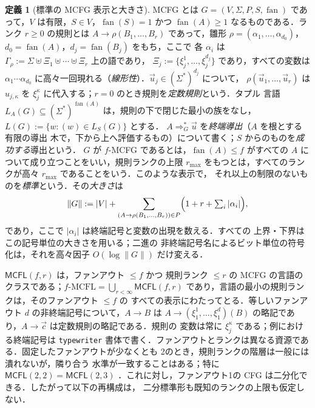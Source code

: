 \documentclass[11pt,a4paper]{ltjsarticle}
\numberwithin{equation}{section}
\theoremstyle{plain}
\theoremstyle{definition}
\newtheorem{definition}[theorem]{定義}
\theoremstyle{remark}
\newcommand{\tuple}[1]{\vec{#1}}
\newcommand{\fan}{\operatorname{fan}}
\theoremstyle{plain}
\begin{document}
\begin{definition}[標準の MCFG 表示と大きさ]
\label{def:standard-mcfg}
MCFG \cite{SekiEtAl1991,Kallmeyer2010} とは
$G=(V,\Sigma,P,S,\fan)$ であって，$V$ は有限，$S\in V$，$\fan(S)=1$ かつ
$\fan(A)\ge1$ なるものである．ランク $r\ge0$ の規則とは
$A\to\rho(B_1,\ldots,B_r)$ であって，雛形
$\rho=(\alpha_1,\ldots,\alpha_{d_0})$，$d_0=\fan(A)$，$d_j=\fan(B_j)$ をもち，ここで
各 $\alpha_i$ は
$\Gamma_\rho:=\Sigma\uplus\Xi_1\uplus\cdots\uplus\Xi_r$ 上の語であり，
$\Xi_j:=\{\xi_j^1,\ldots,\xi_j^{d_j}\}$ であり，すべての変数は
$\alpha_1\cdots\alpha_{d_0}$ に高々一回現れる（\emph{線形性}）．$\tuple u_j\in(\Sigma^*)^{d_j}$ について，
$\rho(\tuple u_1,\ldots,\tuple u_r)$ は $u_{j,\kappa}$ を
$\xi_j^\kappa$ に代入する；$r=0$ のとき規則を\emph{定数規則}という．タプル
言語 $L_A(G)\subseteq(\Sigma^*)^{\fan(A)}$ は，規則の下で閉じた最小の族をなし，
$L(G):=\{w:(w)\in L_S(G)\}$ とする．
$A\Rightarrow_G^*\tuple u$ を\emph{終端導出}（$A$ を根とする有限の導出
木で，下から上へ評価するもの）について書く；$S$ からのものを\emph{成功する}導出という．
$G$ が $f$-MCFG であるとは，$\fan(A)\le f$ がすべての $A$ について成り立つことをいい，規則ランクの上限
$r_{\max}$ をもつとは，すべてのランクが高々 $r_{\max}$ であることをいう．このような表示で，
それ以上の制限のないものを\emph{標準}という．その\emph{大きさ}は
\[
 \|G\|:=|V|+\sum_{(A\to\rho(B_1,\ldots,B_r))\in P}
 \Bigl(1+r+\textstyle\sum_{i}|\alpha_i|\Bigr),
\]
であり，ここで $|\alpha_i|$ は終端記号と変数の出現を数える．すべての
上界・下界はこの記号単位の大きさを用いる；二進の
非終端記号名によるビット単位の符号化は，それを高々因子 $O(\log\|G\|)$ だけ変える．
\end{definition}

$\mathsf{MCFL}(f,r)$ は，ファンアウト $\le f$ かつ
規則ランク $\le r$ の MCFG の言語のクラスである；$f\text{-}\mathrm{MCFL}=\bigcup_{r<\infty}\mathsf{MCFL}(f,r)$
であり，言語の最小の規則ランクは，そのファンアウト $\le f$ の
すべての表示にわたってとる．等しいファンアウト $d$ の非終端記号について，$A\to B$ は
$A\to(\xi_1^1,\ldots,\xi_1^d)(B)$ の略記であり，$A\to\tuple c$ は定数規則の略記である．規則の
変数は常に $\xi_j^\kappa$ である；例における終端記号は
\texttt{typewriter} 書体で書く．ファンアウトとランクは異なる資源である．固定したファンアウトが少なくとも
2のとき，規則ランクの階層は一般には潰れないが，隣り合う
水準が一致することはある；特に
$\mathsf{MCFL}(2,2)=\mathsf{MCFL}(2,3)$
\cite{RambowSatta1999,GomezRodriguezEtAl2009}．これに対し，ファンアウト1の
CFG は二分化できる．したがって以下の再構成は，
二分標準形も既知のランクの上限も仮定しない．
\end{document}

